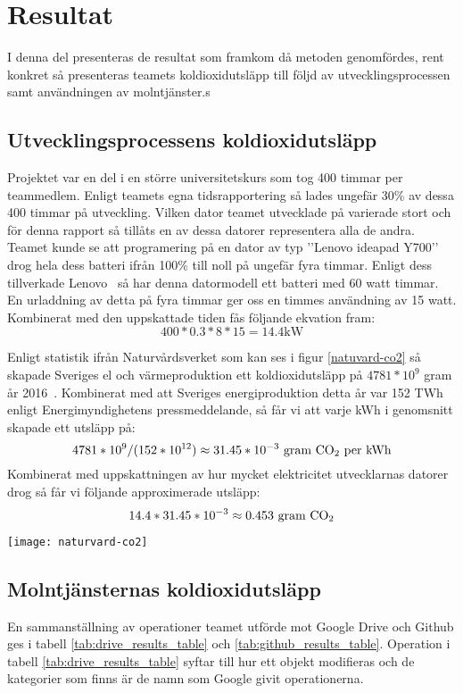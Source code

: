 \section{Resultat}
\label{sec:joel_a-results}
I denna del presenteras de resultat som framkom då metoden genomfördes, rent konkret så presenteras teamets koldioxidutsläpp till följd av utvecklingsprocessen samt användningen av molntjänster.s

\subsection{Utvecklingsprocessens koldioxidutsläpp}
Projektet var en del i en större universitetskurs som tog 400 timmar per teammedlem. Enligt teamets egna tidsrapportering så lades ungefär 30\% av dessa 400 timmar på utveckling. Vilken dator teamet utvecklade på varierade stort och för denna rapport så tillåts en av dessa datorer representera alla de andra. Teamet kunde se att programering på en dator av typ ’’Lenovo ideapad Y700’’ drog hela dess batteri ifrån 100\% till noll på ungefär fyra timmar. Enligt dess tillverkade Lenovo~\cite{lenovo} så har denna datormodell ett batteri med 60 watt timmar. En urladdning av detta på fyra timmar ger oss en timmes användning av 15 watt. Kombinerat med den uppskattade tiden fås följande ekvation fram: $$ 400 * 0.3 * 8* 15 = 14.4 \text{kW}$$

Enligt statistik ifrån Naturvårdsverket som kan ses i figur \ref{natuvard-co2} så skapade Sveriges el och värmeproduktion ett koldioxidutsläpp på $4781*10^9$ gram år 2016~\cite{naturvardsverket}. Kombinerat med att Sveriges energiproduktion detta år var 152 TWh enligt Energimyndighetens pressmeddelande\cite{elprod2016}, så får vi att varje kWh i genomsnitt skapade ett utsläpp på: $$4781*10^9 / (152 * 10^{12}) \approx 31.45 * 10^{-3} \text{ gram \ce{CO2} per kWh}$$ 
Kombinerat med uppskattningen av hur mycket elektricitet utvecklarnas datorer drog så får vi följande approximerade utsläpp: $$14.4 * 31.45 * 10^{-3} \approx 0.453 \text{ gram \ce{CO2}}$$

\begin{figure*}[!htbp]
	\texttt{[image: naturvard-co2]}
	\caption{Statistik ifrån naturvårdsverket~\cite{naturvardsverket}}
	\label{natuvard-co2}
\end{figure*}



\subsection{Molntjänsternas koldioxidutsläpp}
En sammanställning av operationer teamet utförde mot Google Drive och Github ges i tabell \ref{tab:drive_results_table} och \ref{tab:github_results_table}. Operation i tabell \ref{tab:drive_results_table} syftar till hur ett objekt modifieras och de kategorier som finns är de namn som Google givit operationerna.

